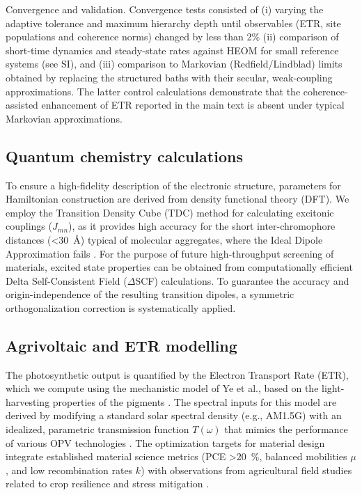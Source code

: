\documentclass[aps,prb,onecolumn,superscriptaddress,notitlepage,nofootinbib,longbibliography,10pt]{revtex4-2}
\begin{document}
Convergence and validation. Convergence tests consisted of (i) varying the adaptive tolerance and maximum hierarchy depth until observables (ETR, site populations and coherence norms) changed by less than 2\% (ii) comparison of short-time dynamics and steady-state rates against HEOM for small reference systems (see SI), and (iii) comparison to Markovian (Redfield/Lindblad) limits obtained by replacing the structured baths with their secular, weak-coupling approximations. The latter control calculations demonstrate that the coherence-assisted enhancement of ETR reported in the main text is absent under typical Markovian approximations.


\subsection{Quantum chemistry calculations}\label{sec:QChem-calc}

To ensure a high-fidelity description of the electronic structure, parameters for Hamiltonian construction are derived from density functional theory (DFT). We employ the Transition Density Cube (TDC) method for calculating excitonic couplings ($J_{mn}$), as it provides high accuracy for the short inter-chromophore distances (\SI{<30}{\angstrom}) typical of molecular aggregates, where the Ideal Dipole Approximation fails \cite{lee2015, Volpert2023}. For the purpose of future high-throughput screening of materials, excited state properties can be obtained from computationally efficient Delta Self-Consistent Field ($\Delta$SCF) calculations. To guarantee the accuracy and origin-independence of the resulting transition dipoles, a symmetric orthogonalization correction is systematically applied.

\subsection{Agrivoltaic and ETR modelling}\label{sec:Agrivoltaic}

The photosynthetic output is quantified by the Electron Transport Rate (ETR), which we compute using the mechanistic model of Ye et al., based on the light-harvesting properties of the pigments \cite{ye2012}. The spectral inputs for this model are derived by modifying a standard solar spectral density (e.g., AM1.5G) with an idealized, parametric transmission function $T(\omega)$ that mimics the performance of various OPV technologies \cite{MaLu2025}. The optimization targets for material design integrate established material science metrics (PCE \SI{>20}{\percent}, balanced mobilities $\mu$, and low recombination rates $k$) with observations from agricultural field studies related to crop resilience and stress mitigation \cite{firdaus2019, Scarano2024, Adeyemi2025}.
\end{document}
